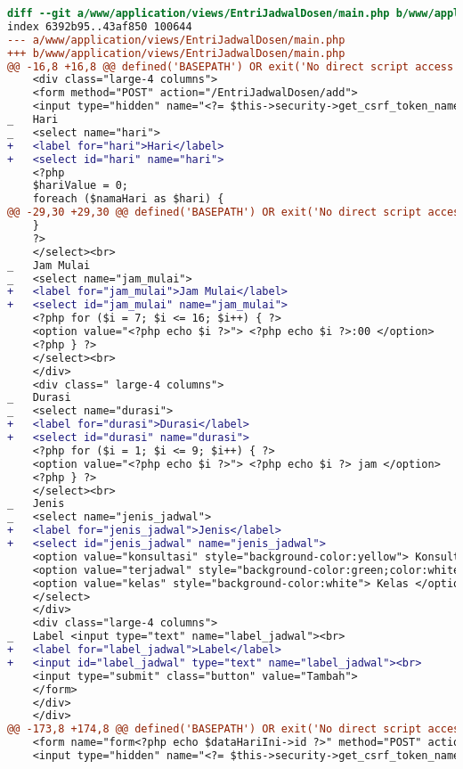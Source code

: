 \begin{lstlisting}[frame=single, label={lst:perbaikan_2.5.3_label_dan_nama_pada_komponen_masukan}, language=diff, caption=Perbaikan Kriteria Sukses 2.5.3]
diff --git a/www/application/views/EntriJadwalDosen/main.php b/www/application/views/EntriJadwalDosen/main.php
index 6392b95..43af850 100644
--- a/www/application/views/EntriJadwalDosen/main.php
+++ b/www/application/views/EntriJadwalDosen/main.php
@@ -16,8 +16,8 @@ defined('BASEPATH') OR exit('No direct script access allowed');
    <div class="large-4 columns">
    <form method="POST" action="/EntriJadwalDosen/add">
    <input type="hidden" name="<?= $this->security->get_csrf_token_name() ?>" value="<?= $this->security->get_csrf_hash() ?>" />
_   Hari
_   <select name="hari"> 
+   <label for="hari">Hari</label>
+   <select id="hari" name="hari"> 
    <?php
    $hariValue = 0;
    foreach ($namaHari as $hari) {
@@ -29,30 +29,30 @@ defined('BASEPATH') OR exit('No direct script access allowed');
    }
    ?>
    </select><br>
_   Jam Mulai
_   <select name="jam_mulai"> 
+   <label for="jam_mulai">Jam Mulai</label>
+   <select id="jam_mulai" name="jam_mulai">  
    <?php for ($i = 7; $i <= 16; $i++) { ?>
    <option value="<?php echo $i ?>"> <?php echo $i ?>:00 </option>
    <?php } ?>
    </select><br>
    </div>
    <div class=" large-4 columns">
_   Durasi
_   <select name="durasi"> 
+   <label for="durasi">Durasi</label>
+   <select id="durasi" name="durasi">  
    <?php for ($i = 1; $i <= 9; $i++) { ?>
    <option value="<?php echo $i ?>"> <?php echo $i ?> jam </option>
    <?php } ?>
    </select><br>
_   Jenis  
_   <select name="jenis_jadwal"> 
+   <label for="jenis_jadwal">Jenis</label>
+   <select id="jenis_jadwal" name="jenis_jadwal">  
    <option value="konsultasi" style="background-color:yellow"> Konsultasi </option>
    <option value="terjadwal" style="background-color:green;color:white"> Terjadwal</option>
    <option value="kelas" style="background-color:white"> Kelas </option>
    </select>
    </div>
    <div class="large-4 columns">
_   Label <input type="text" name="label_jadwal"><br>
+   <label for="label_jadwal">Label</label>
+   <input id="label_jadwal" type="text" name="label_jadwal"><br>
    <input type="submit" class="button" value="Tambah">
    </form>
    </div>
    </div>
@@ -173,8 +174,8 @@ defined('BASEPATH') OR exit('No direct script access allowed');
    <form name="form<?php echo $dataHariIni->id ?>" method="POST" action="/EntriJadwalDosen/update/<?php echo $dataHariIni->id ?>">
    <input type="hidden" name="<?= $this->security->get_csrf_token_name() ?>" value="<?= $this->security->get_csrf_hash() ?>" />

\end{lstlisting}
